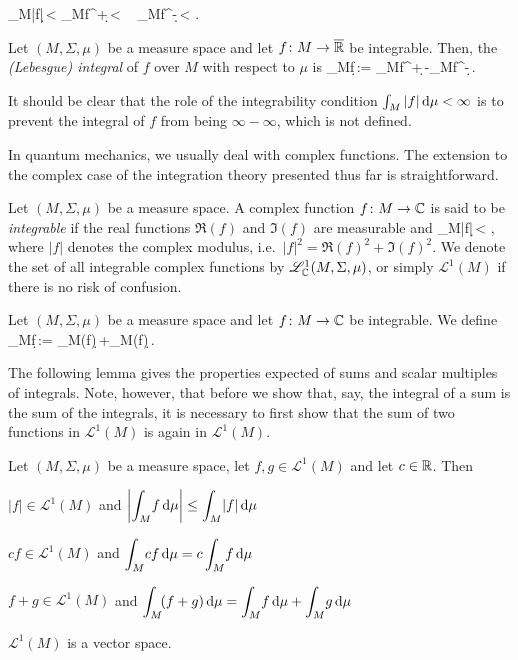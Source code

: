 \bse
\int_{M}\!|f|\,\d \mu < \infty\quad \Leftrightarrow \quad \int_{M}\!f^+\,\d \mu < \infty\  \int_{M}\!f^-\,\d \mu < \infty.
\ese


\bd
Let $(M,\Sigma,\mu)$ be a measure space and let $f\colon M\to\overline{\mathbb{R}}$ be integrable. Then, the \emph{(Lebesgue) integral} of $f$ over $M$ with respect to $\mu$ is
\bse
\int_{M}\!f\,\d \mu := \int_{M}\!f^+\,\d \mu -\int_{M}\!f^-\,\d \mu .
\ese
\ed

It should be clear that the role of the integrability condition $\int_M |f|\, \mathrm{d} \mu<\infty$ is to prevent the integral of $f$ from being $\infty-\infty$, which is not defined.

In quantum mechanics, we usually deal with complex functions. The extension to the complex case of the integration theory presented thus far is straightforward.

\bd
Let $(M,\Sigma,\mu)$ be a measure space. A complex function $f\colon M\to\mathbb{C}$ is said to be \emph{integrable} if the real functions $\Re(f)$ and $\Im(f)$ are measurable and
\bse
\int_{M}\!|f|\,\d \mu < \infty,
\ese
where $|f|$ denotes the complex modulus, i.e.\ $|f|^2=\Re(f)^2+\Im(f)^2$. We denote the set of all integrable complex functions by $\mathscr{L}^1_{\mathbb{C}}(M,\Sigma,\mu)$, or simply $\mathscr{L}^1(M)$ if there is no risk of confusion.
\ed

\bd
Let $(M,\Sigma,\mu)$ be a measure space and let $f\colon M\to\mathbb{C}$ be integrable. We define
\bse
\int_{M}\!f\,\d \mu := \int_{M}\!\Re(f)\,\d \mu +\int_{M}\!\Im(f)\,\d \mu .
\ese
\ed







The following lemma gives the properties expected of sums and scalar multiples of integrals. Note, however, that before we show that, say, the integral of a sum is the sum of the integrals, it is necessary to first show that the sum of two functions in $\mathscr{L}^1(M)$ is again in $\mathscr{L}^1(M)$.

\pagebreak

\bl
\label{lem:l1vs}
Let $(M,\Sigma,\mu)$ be a measure space, let $f,g \in \mathscr{L}^1(M)$ and let $c \in \mathbb{R}$. Then
\ben[label=(\roman*)]
\item $|f| \in \mathscr{L}^1(M)$ and $ \displaystyle \biggl| \int_M \! f \, \mathrm{d} \mu \biggr| \leq \int_M \! | f| \, \mathrm{d} \mu $
\item $c f \in \mathscr{L}^1(M)$ and $ \displaystyle \int_M \! cf \, \mathrm{d} \mu = c \int_M \!  f \, \mathrm{d} \mu$
\item $f+g \in \mathscr{L}^1(M)$ and $ \displaystyle \int_M \! (f+g) \, \mathrm{d} \mu = \int_M \!  f \, \mathrm{d} \mu +  \int_M \!  g \, \mathrm{d} \mu$
\item $\mathscr{L}^1(M)$ is a vector space.
\een
\el

